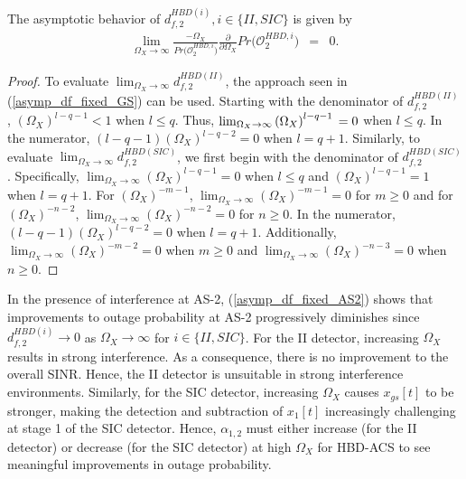 \begin{corollary}
The asymptotic behavior of $d_{f,2}^{HBD(i)}, i \in \{II,SIC\}$ is given by
\begin{eqnarray} \label{asymp_df_fixed_AS2}
\lim_{\Omega_X\to\infty} \frac{-\Omega_X}{Pr\big(\mathcal{O}_{2}^{HBD,i}\big)}\frac{\partial}{\partial\Omega_X}Pr\big(\mathcal{O}_{2}^{HBD,i}\big) & = & 0.
\end{eqnarray}
\end{corollary}
\begin{proof}
To evaluate $\lim_{\Omega_X\to\infty} d_{f,2}^{HBD(II)}$, the approach seen in (\ref{asymp_df_fixed_GS}) can be used. Starting with the denominator of $d_{f,2}^{HBD(II)}$, $\left(\Omega_X\right)^{l-q-1} < 1$ when $l \leq q$. Thus, $\lim_{\Omega_X\to\infty} \left(\Omega_X\right)^{l-q-1} \\ = 0$ when $l \leq q$. In the numerator, $(l-q-1) \left(\Omega_X\right)^{l-q-2} = 0$ when $l=q+1$. Similarly, to evaluate $\lim_{\Omega_X\to\infty} d_{f,2}^{HBD(SIC)}$, we first begin with the denominator of $d_{f,2}^{HBD(SIC)}$. Specifically, $\lim_{\Omega_X\to\infty}(\Omega_X)^{l-q-1}=0 $ when $l\leq{q}$ and $(\Omega_X)^{l-q-1}=1$ when $l=q+1$. For $(\Omega_X)^{-m-1}$, $\lim_{\Omega_X\to\infty}(\Omega_X)^{-m-1}=0 $ for $m\geq0$ and for $(\Omega_X)^{-n-2}$, $\lim_{\Omega_X\to\infty}(\Omega_X)^{-n-2}=0 $ for $n\geq0$. In the numerator, $(l-q-1) \left(\Omega_X\right)^{l-q-2} = 0$ when $l=q+1$. Additionally, $\lim_{\Omega_X\to\infty} (\Omega_X)^{-m-2}=0$ when $m\geq0$ and $\lim_{\Omega_X\to\infty} (\Omega_X)^{-n-3}=0$ when $n\geq0$.
\end{proof}


In the presence of interference at AS-2, (\ref{asymp_df_fixed_AS2}) shows that improvements to outage probability at AS-2 progressively diminishes since $d_{f,2}^{HBD(i)} \to 0$ as $\Omega_X \to \infty$ for $i \in \{II,SIC\}$. For the II detector, increasing $\Omega_X$ results in strong interference. As a consequence, there is no improvement to the overall SINR. Hence, the II detector is unsuitable in strong interference environments. Similarly, for the SIC detector, increasing $\Omega_X$ causes $x_{gs}[t]$ to be stronger, making the detection and subtraction of $x_1[t]$ increasingly challenging at stage 1 of the SIC detector. Hence, $\alpha_{1,2}$ must either increase (for the II detector) or decrease (for the SIC detector) at high $\Omega_X$ for HBD-ACS to see meaningful improvements in outage probability.

